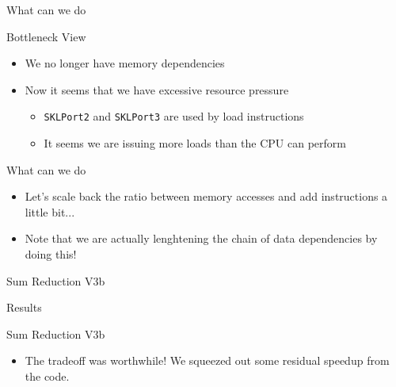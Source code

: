 \begin{frame}{What can we do}
\begin{block}{Bottleneck View}
\end{block}
\begin{itemize}
\item We no longer have memory dependencies
\item Now it seems that we have excessive resource pressure
	\begin{itemize}
	\item \texttt{SKLPort2} and \texttt{SKLPort3} are used by \alert{load instructions}
	\item It seems we are issuing more loads than the CPU can perform 
	\end{itemize}
\end{itemize}
\end{frame}


\begin{frame}{What can we do}
\begin{itemize}
\item Let's scale back the ratio between memory accesses and add instructions a little bit...
\item Note that we are actually \alert{lenghtening} the chain of data dependencies by doing this!
\end{itemize}

\begin{block}{Sum Reduction V3b}
\end{block}
\end{frame}


\begin{frame}{Results}
\begin{block}{Sum Reduction V3b}
\end{block}
\begin{itemize}
\item The tradeoff was worthwhile! We squeezed out some residual speedup from the code.
\end{itemize}
\end{frame}


